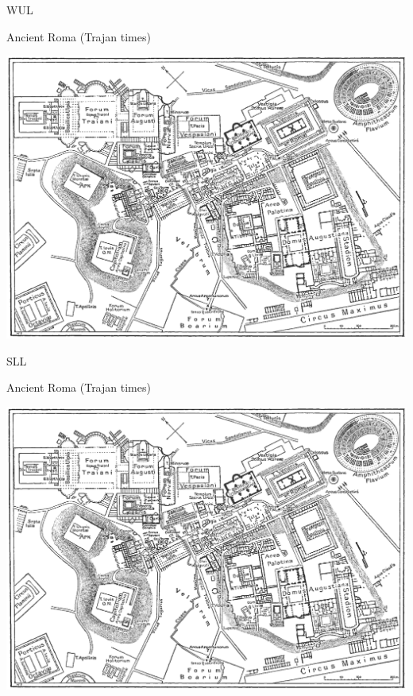 \documentclass[print,Draft]{faosyb}
\begin{document}
\begin{map}{W}{UL}
\caption{Ancient Roma  (Trajan times)}
\label{map:roma}
\includegraphics[width=\chartwidth,height=\chartheight]{Rome}
\end{map}


\begin{map}{S}{LL}
\caption{Ancient Roma  (Trajan times)}
\label{map:roma}
\includegraphics[width=\chartwidth,height=\chartheight]{Rome}
\end{map}
\end{document}
